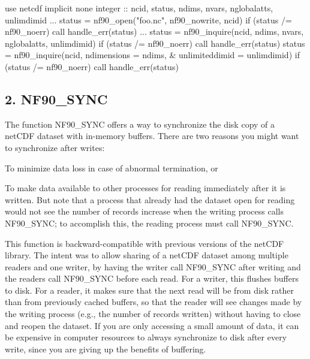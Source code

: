 \begin{DoxyCode}
\textcolor{keywordtype}{use }netcdf
\textcolor{keywordtype}{implicit none}
\textcolor{keywordtype}{integer} :: ncid, status, ndims, nvars, nglobalatts, unlimdimid
...
status = nf90\_open(\textcolor{stringliteral}{"foo.nc"}, nf90\_nowrite, ncid)
\textcolor{keywordflow}{if} (status /= nf90\_noerr) \textcolor{keyword}{call }handle\_err(status)
...  
status = nf90\_inquire(ncid, ndims, nvars, nglobalatts, unlimdimid)
\textcolor{keywordflow}{if} (status /= nf90\_noerr) \textcolor{keyword}{call }handle\_err(status)
status = nf90\_inquire(ncid, ndimensions = ndims, &
                      unlimiteddimid = unlimdimid)
\textcolor{keywordflow}{if} (status /= nf90\_noerr) \textcolor{keyword}{call }handle\_err(status)
\end{DoxyCode}
\hypertarget{f90_datasets_f90-nf90_sync}{}\subsection{2. N\+F90\+\_\+\+S\+Y\+N\+C }\label{f90_datasets_f90-nf90_sync}
The function N\+F90\+\_\+\+S\+Y\+NC offers a way to synchronize the disk copy of a net\+C\+DF dataset with in-\/memory buffers. There are two reasons you might want to synchronize after writes\+:


\begin{DoxyItemize}
\item To minimize data loss in case of abnormal termination, or
\item To make data available to other processes for reading immediately after it is written. But note that a process that already had the dataset open for reading would not see the number of records increase when the writing process calls N\+F90\+\_\+\+S\+Y\+NC; to accomplish this, the reading process must call N\+F90\+\_\+\+S\+Y\+NC.
\end{DoxyItemize}

This function is backward-\/compatible with previous versions of the net\+C\+DF library. The intent was to allow sharing of a net\+C\+DF dataset among multiple readers and one writer, by having the writer call N\+F90\+\_\+\+S\+Y\+NC after writing and the readers call N\+F90\+\_\+\+S\+Y\+NC before each read. For a writer, this flushes buffers to disk. For a reader, it makes sure that the next read will be from disk rather than from previously cached buffers, so that the reader will see changes made by the writing process (e.\+g., the number of records written) without having to close and reopen the dataset. If you are only accessing a small amount of data, it can be expensive in computer resources to always synchronize to disk after every write, since you are giving up the benefits of buffering.


